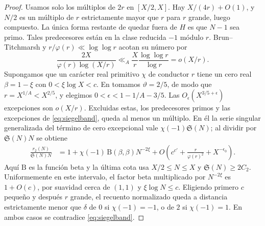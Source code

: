 \documentclass[11pt,a4paper]{article}
\newcommand{\B}[2]{#2}
\newcommand{\B}[2]{#1}
\newcommand{\Sg}{\mathfrak S}
\begin{document}
\begin{proof}
\B{Use only multiples of $2r$ in $[X/2,X]$. There are $X/(4r)+O(1)$, and $N/2$ is a multiple of $r$ strictly greater than $r$ for large $r$, hence composite. The only remaining way to fall outside $H$ is for $N-1$ to be prime. Such predecessors lie in the reduced class $-1$ modulo $r$. Brun--Titchmarsh and $r/\varphi(r)\ll\log\log r$ bound their number by}{Usamos solo los múltiplos de $2r$ en $[X/2,X]$. Hay $X/(4r)+O(1)$, y $N/2$ es un múltiplo de $r$ estrictamente mayor que $r$ para $r$ grande, luego compuesto. La única forma restante de quedar fuera de $H$ es que $N-1$ sea primo. Tales predecesores están en la clase reducida $-1$ módulo $r$. Brun--Titchmarsh y $r/\varphi(r)\ll\log\log r$ acotan su número por}
\[
 \frac{2X}{\varphi(r)\log(X/r)}\ll_A\frac{X}{r}\frac{\log\log r}{\log r}=o(X/r).
\]
\B{Suppose a primitive real $\chi$ of conductor $r$ has a real zero $\beta=1-\xi$ with $0<\xi\log X<c$. In \cite[Proposition 8.1]{bg} take $\vartheta=2/5$, so $r=X^{1/A}<X^{2/5}$, and choose $0<\epsilon<1-1/A-3/5$. The $O_\epsilon(X^{3/5+\epsilon})$ exceptions are $o(X/r)$. After excluding these, the prime predecessors, and the exceptions in \eqref{eq:siegelband}, at least one multiple remains. For it the generalized singular series in the exceptional-zero term equals $\chi(-1)\Sg(N)$; division by $\Sg(N)N$ gives}{Supongamos que un carácter real primitivo $\chi$ de conductor $r$ tiene un cero real $\beta=1-\xi$ con $0<\xi\log X<c$. En \cite[Proposición 8.1]{bg} tomamos $\vartheta=2/5$, de modo que $r=X^{1/A}<X^{2/5}$, y elegimos $0<\epsilon<1-1/A-3/5$. Las $O_\epsilon(X^{3/5+\epsilon})$ excepciones son $o(X/r)$. Excluidas estas, los predecesores primos y las excepciones de \eqref{eq:siegelband}, queda al menos un múltiplo. En él la serie singular generalizada del término de cero excepcional vale $\chi(-1)\Sg(N)$; al dividir por $\Sg(N)N$ se obtiene}
\begin{align*}
 \frac{r_2(N)}{\Sg(N)N}&=1+\chi(-1)\,\mathrm B(\beta,\beta)N^{-2\xi}+O\!\left(c^{c'}+\frac{r}{\varphi(r)^2}+X^{-\epsilon_0}\right).
\end{align*}
\B{Here $\mathrm B$ is the beta function and the last bound uses $X/2\le N\le X$ and $\Sg(N)\ge2C_2$. Uniformly on this interval, the beta factor times $N^{-2\xi}$ is $1+O(c)$, by smoothness near $(1,1)$ and $\xi\log N\le c$. Choosing $c$ small and then $r$ large makes the normalized count lie within strictly less than $\delta$ of $0$ if $\chi(-1)=-1$, or of $2$ if $\chi(-1)=1$. Either case contradicts \eqref{eq:siegelband}.}{Aquí $\mathrm B$ es la función beta y la última cota usa $X/2\le N\le X$ y $\Sg(N)\ge2C_2$. Uniformemente en este intervalo, el factor beta multiplicado por $N^{-2\xi}$ es $1+O(c)$, por suavidad cerca de $(1,1)$ y $\xi\log N\le c$. Eligiendo primero $c$ pequeño y después $r$ grande, el recuento normalizado queda a distancia estrictamente menor que $\delta$ de $0$ si $\chi(-1)=-1$, o de $2$ si $\chi(-1)=1$. En ambos casos se contradice \eqref{eq:siegelband}.}
\end{proof}
\end{document}
